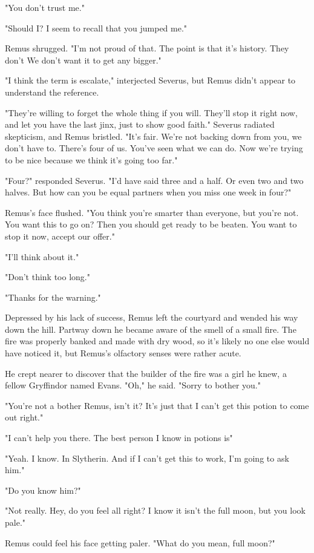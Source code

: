 "You don't trust me."

"Should I? I seem to recall that you jumped me."

Remus shrugged. "I'm not proud of that. The point is that it's history. They don't{\el} We don't want it to get any bigger."

"I think the term is escalate," interjected Severus, but Remus didn't appear to understand the reference.

"They're willing to forget the whole thing if you will. They'll stop it right now, and let you have the last jinx, just to show good faith." Severus radiated skepticism, and Remus bristled. "It's fair. We're not backing down from you, we don't have to. There's four of us. You've seen what we can do. Now we're trying to be nice because we think it's going too far."

"Four?" responded Severus. "I'd have said three and a half. Or even two and two halves. But how can you be equal partners when you miss one week in four?"

Remus's face flushed. "You think you're smarter than everyone, but you're not. You want this to go on? Then you should get ready to be beaten. You want to stop it now, accept our offer."

"I'll think about it."

"Don't think too long."

"Thanks for the warning."

Depressed by his lack of success, Remus left the courtyard and wended his way down the hill. Partway down he became aware of the smell of a small fire. The fire was properly banked and made with dry wood, so it's likely no one else would have noticed it, but Remus's olfactory senses were rather acute.

He crept nearer to discover that the builder of the fire was a girl he knew, a fellow Gryffindor named Evans. "Oh," he said. "Sorry to bother you."

"You're not a bother{\el} Remus, isn't it? It's just that I can't get this potion to come out right."

"I can't help you there. The best person I know in potions is{\el}"

"Yeah. I know. In Slytherin. And if I can't get this to work, I'm going to ask him."

"Do you know him?"

"Not really. Hey, do you feel all right? I know it isn't the full moon, but you look pale."

Remus could feel his face getting paler. "What do you mean, full moon?"

